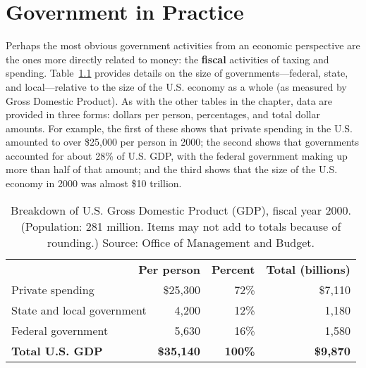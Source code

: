 \chapter{Government in Practice}
\label{4practice}

Perhaps the most obvious government activities from an economic perspective are the ones more directly related to money: the \textbf{fiscal} activities of taxing and spending. Table~\ref{gdpbreakdown} provides details on the size of governments---federal, state, and local---relative to the size of the U.S. economy as a whole (as measured by Gross Domestic Product). As with the other tables in the chapter, data are provided in three forms: dollars per person, percentages, and total dollar amounts. For example, the first of these shows that private spending in the U.S. amounted to over \$25,000 per person in 2000; the second shows that governments accounted for about 28\% of U.S. GDP, with the federal government making up more than half of that amount; and the third shows that the size of the U.S. economy in 2000 was almost \$10 trillion.

\begin{table}
\begin{center}
\begin{tabular}{lrrr}
\multicolumn{2}{r}{\bf Per person} & \bf Percent & \bf Total (billions)\\ 
Private spending & \$25,300 & 72\% & \$7,110 \\
State and local government & 4,200 & 12\% & 1,180 \\
Federal government & 5,630 & 16\% & 1,580 \\
\bf Total U.S. GDP & \bf \$35,140 & \bf 100\% & \bf \$9,870 \\  %
\end{tabular}
\end{center}
\caption[Breakdown of U.S. Gross Domestic Product (GDP), fiscal year 2000.]{Breakdown of U.S. Gross Domestic Product (GDP), fiscal year 2000. (Population: 281 million. Items may not add to totals because of rounding.) Source: Office of Management and Budget.}
\label{gdpbreakdown}
\end{table}





